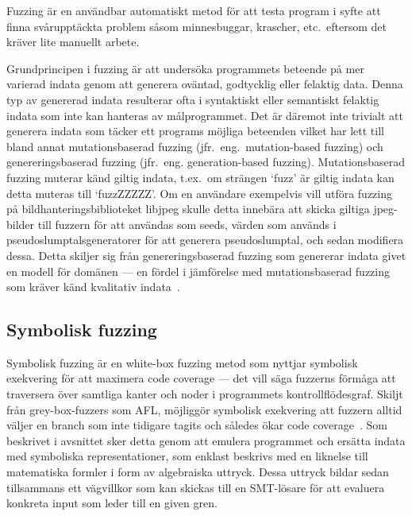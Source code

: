 Fuzzing är en användbar automatiskt metod för att testa program i syfte att finna
svårupptäckta problem såsom minnesbuggar, krascher, etc.\ eftersom det kräver lite
manuellt arbete.

Grundprincipen i fuzzing är att undersöka programmets beteende på mer varierad
indata genom att generera oväntad, godtycklig eller felaktig data. Denna typ av
genererad indata resulterar ofta i syntaktiskt eller semantiskt felaktig indata
som inte kan hanteras av målprogrammet. Det är däremot inte trivialt att generera
indata som täcker ett programs möjliga beteenden vilket har lett till bland annat
mutationsbaserad fuzzing (jfr.\ eng.\ mutation-based fuzzing) och genereringsbaserad
fuzzing (jfr.\ eng. generation-based fuzzing). Mutationsbaserad fuzzing muterar känd giltig indata,
t.ex.\ om strängen `fuzz' är giltig indata kan detta muteras till `fuzzZZZZZ'. Om
en användare exempelvis vill utföra fuzzing på bildhanteringsbiblioteket libjpeg skulle
detta innebära att skicka giltiga jpeg-bilder till fuzzern för att användas som
seeds, värden som används i pseudoslumptalsgeneratorer för att generera
pseudoslumptal, och sedan modifiera dessa. Detta skiljer sig från
genereringsbaserad fuzzing som genererar indata givet en modell för domänen ---
en fördel i jämförelse med mutationsbaserad fuzzing som kräver känd kvalitativ
indata~\cite{fuzzing}.

\subsection{Symbolisk fuzzing} Symbolisk fuzzing är en white-box fuzzing metod
som nyttjar symbolisk exekvering för att maximera code coverage --- det vill säga fuzzerns
förmåga att traversera över samtliga kanter och noder i programmets kontrollflödesgraf.
Skiljt från grey-box-fuzzers som AFL, möjliggör symbolisk exekvering att fuzzern alltid
väljer en branch som inte tidigare tagits och således ökar code coverage~\cite{challenges_fuzzing}.
Som beskrivet i avsnittet  sker detta genom att emulera programmet
och ersätta indata med symboliska representationer, som enklast beskrivs med en liknelse till
matematiska formler i form av algebraiska uttryck. Dessa uttryck bildar sedan tillsammans ett vägvillkor
som kan skickas till en SMT-lösare för att evaluera konkreta input som leder till en given gren.


